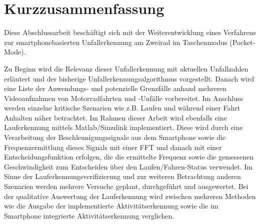 \chapter*{Kurzzusammenfassung}
%
%
%
%
%
%
%
%
%
%
%
%

Diese Abschlussarbeit beschäftigt sich mit der Weiterentwicklung eines Verfahrens zur smartphonebasierten Unfallerkennung am Zweirad im Taschenmodus (Pocket-Mode). 

Zu Beginn wird die Relevanz dieser Unfallerkennung mit aktuellen Unfall\-zahlen er\-läut\-ert und der bisherige Unfallerkennungsalgorithmus vorgestellt.
Danach wird eine Liste der Anwendungs- und potenzielle Grenzfälle anhand mehreren Videoaufnahmen von Motorradfahrten und -Unfälle vorbereitet. Im Anschluss werden einzelne kritische Szenarien wie z.B. Laufen und während einer Fahrt Anhalten näher betrachtet.
Im Rahmen dieser Arbeit wird ebenfalls eine Lauferkennung mittels Matlab/Simulink implementiert. Diese wird durch eine Verarbeitung der Beschleunigungssignale aus dem Smartphone sowie die Frequenzermittlung dieses Signals mit einer FFT und danach mit einer Entscheidungsfunktion erfolgen, die die ermittelte Frequenz sowie die gemessenen Geschwindigkeit zum Entscheiden über den Laufen/Fahren-Status verwendet.
Im Sinne der Lauferkennungsverifizierung und zur weiteren Betrachtung anderen Szenarien werden mehrere Versuche geplant, durchgeführt und ausgewertet.
Bei der qualitative Auswertung der Lauferkennung wird zwischen mehreren Methoden wie die Ausgabe der implementierte Aktivitätserkennung sowie die im Smartphone integrierte Aktivitätserkennung verglichen. 



